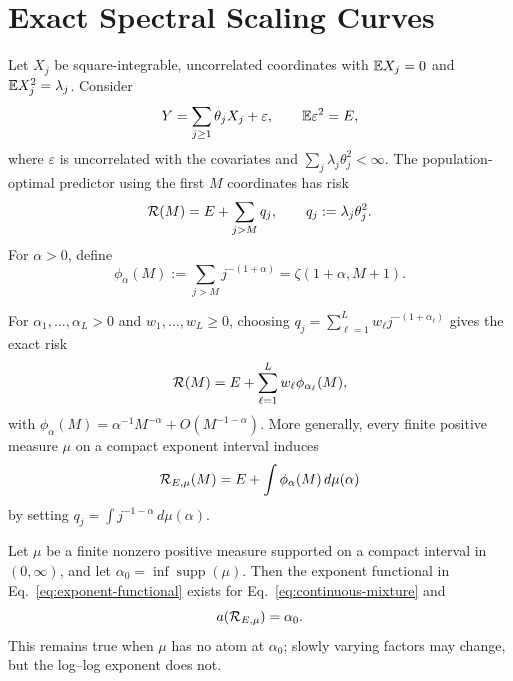 \section{Exact Spectral Scaling Curves}

Let $X_j$ be square-integrable, uncorrelated coordinates with $\mathbb{E} X_j=0$ and $\mathbb{E} X_j^2=\lambda_j$. Consider
\begin{equation}
 Y=\sum_{j\ge1}\theta_jX_j+\varepsilon,
 \qquad \mathbb{E}\varepsilon^2=E,
 \label{eq:linreg}
\end{equation}
where $\varepsilon$ is uncorrelated with the covariates and $\sum_j\lambda_j\theta_j^2<\infty$. The population-optimal predictor using the first $M$ coordinates has risk
\begin{equation}
 \mathcal{R}(M)=E+\sum_{j>M}q_j,
 \qquad q_j:=\lambda_j\theta_j^2.
 \label{eq:spectral-tail}
\end{equation}
For $\alpha>0$, define
\begin{equation}
 \phi_\alpha(M):=\sum_{j>M}j^{-(1+\alpha)}
 =\zeta(1+\alpha,M+1).
 \label{eq:basis}
\end{equation}

\begin{proposition}
\label{prop:realizability}
For $\alpha_1,\ldots,\alpha_L>0$ and $w_1,\ldots,w_L\ge0$, choosing
$q_j=\sum_{\ell=1}^Lw_\ell j^{-(1+\alpha_\ell)}$ gives the exact risk
\begin{equation}
 \mathcal{R}(M)=E+\sum_{\ell=1}^Lw_\ell\phi_{\alpha_\ell}(M),
 \label{eq:mixture}
\end{equation}
with $\phi_\alpha(M)=\alpha^{-1}M^{-\alpha}+O(M^{-1-\alpha})$.
More generally, every finite positive measure $\mu$ on a compact exponent interval induces
\begin{equation}
 \mathcal{R}_{E,\mu}(M)=E+\int\phi_\alpha(M)\,d\mu(\alpha)
 \label{eq:continuous-mixture}
\end{equation}
by setting $q_j=\int j^{-1-\alpha}\,d\mu(\alpha)$.
\end{proposition}

\begin{proposition}
\label{prop:slowest-support}
Let $\mu$ be a finite nonzero positive measure supported on a compact interval in $(0,\infty)$, and let
$\alpha_0=\inf\operatorname{supp}(\mu)$. Then the exponent functional in Eq.~\eqref{eq:exponent-functional} exists for Eq.~\eqref{eq:continuous-mixture} and
\begin{equation}
 a(\mathcal{R}_{E,\mu})=\alpha_0.
 \label{eq:slowest-support}
\end{equation}
This remains true when $\mu$ has no atom at $\alpha_0$; slowly varying factors may change, but the log--log exponent does not.
\end{proposition}

